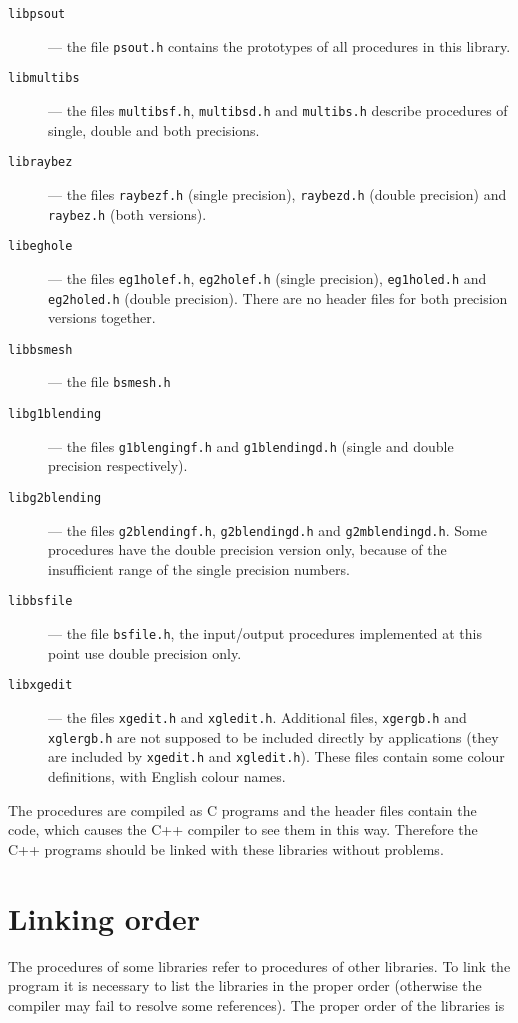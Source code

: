 \begin{description}
\item[\texttt{libpsout}]--- the file \texttt{psout.h} contains the prototypes
of all procedures in this library.
\item[\texttt{libmultibs}]--- the files \texttt{multibsf.h}, \texttt{multibsd.h}
and \texttt{multibs.h} describe procedures of single, double and both precisions.
\item[\texttt{libraybez}]--- the files \texttt{raybezf.h} (single precision),
\texttt{raybezd.h} (double precision) and \texttt{raybez.h} (both versions).
\item[\texttt{libeghole}]--- the files \texttt{eg1holef.h}, \texttt{eg2holef.h}
(single precision), \texttt{eg1holed.h} and \texttt{eg2holed.h}
(double precision). There are no header files for both precision versions together.
\item[\texttt{libbsmesh}]--- the file \texttt{bsmesh.h}
\item[\texttt{libg1blending}]--- the files \texttt{g1blengingf.h} and
\texttt{g1blendingd.h} (single and double precision respectively).
\item[\texttt{libg2blending}]--- the files \texttt{g2blendingf.h},
\texttt{g2blendingd.h} and \texttt{g2mblendingd.h}. Some procedures have the
double precision version only, because of the insufficient range of the
single precision numbers.
\item[\texttt{libbsfile}]--- the file \texttt{bsfile.h}, the input/output
procedures implemented at this point use double precision only.
\item[\texttt{libxgedit}]--- the files \texttt{xgedit.h} and
\texttt{xgledit.h}. Additional files, \texttt{xgergb.h} and
\texttt{xglergb.h} are not supposed to be included directly by applications
(they are included by \texttt{xgedit.h} and \texttt{xgledit.h}). These files
contain some colour definitions, with English colour names.
\end{description}

The procedures are compiled as C programs and the header files contain
the code, which causes the C++ compiler to see them in this way.
Therefore the C++ programs should be linked with these libraries without
problems.


\section{Linking order}

The procedures of some libraries refer to procedures of other libraries.
To link the program it is necessary to list the libraries in the proper 
order (otherwise the compiler may fail to resolve some references).
The proper order of the libraries is


